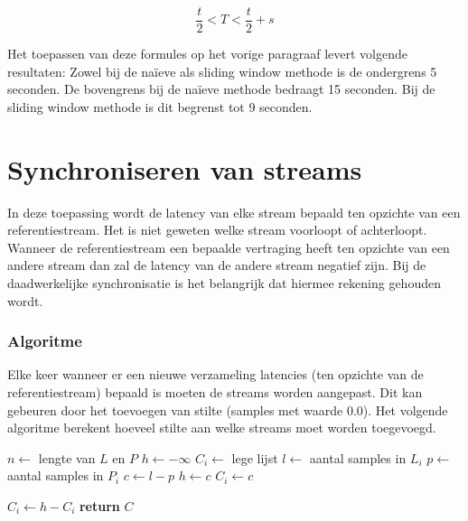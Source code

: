 \begin{equation}
	\frac{t}{2} < T < \frac{t}{2} + s
\end{equation}

Het toepassen van deze formules op het vorige paragraaf levert volgende resultaten: Zowel bij de naïeve als sliding window methode is de ondergrens 5 seconden. De bovengrens bij de naïeve methode bedraagt 15 seconden. Bij de sliding window methode is dit begrenst tot 9 seconden.

\section{Synchroniseren van streams}
\label{corrections}

In deze toepassing wordt de latency van elke stream bepaald ten opzichte van een referentiestream. Het is niet geweten welke stream voorloopt of achterloopt. Wanneer de referentiestream een bepaalde vertraging heeft ten opzichte van een andere stream dan zal de latency van de andere stream negatief zijn. Bij de daadwerkelijke synchronisatie is het belangrijk dat hiermee rekening gehouden wordt.

\subsubsection{Algoritme}

Elke keer wanneer er een nieuwe verzameling latencies (ten opzichte van de referentiestream) bepaald is moeten de streams worden aangepast. Dit kan gebeuren door het toevoegen van stilte (samples met waarde 0.0). Het volgende algoritme berekent hoeveel stilte aan welke streams moet worden toegevoegd.

\begin{algorithm}
	\label{sync-algo}
	\begin{algorithmic}[1] %
		 
		\State $n\gets$ lengte van $L$ en $P$
		\State $h\gets -\infty$ 
		\State $C_i\gets$ lege lijst 
			\State $l\gets$ aantal samples in $L_i$
			\State $p\gets$ aantal samples in $P_i$
			\State $c\gets l - p $ 
				\State $h\gets c$ 
			\EndIf
			\State $C_i\gets c$
		\EndFor
		
			\State $C_i\gets h - C_i$
		\EndFor
		\State \textbf{return} $C$
		\EndFunction
	\end{algorithmic}
\end{algorithm}

